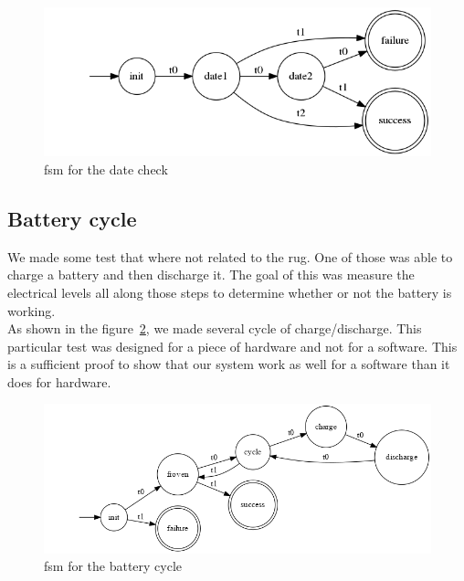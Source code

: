 \documentclass[12pt]{article}
\theoremstyle{definition}
\theoremstyle{definition}
\begin{document}
\begin{figure}
    \centering
    \includegraphics[scale=0.6]{graph/DateCheck}
    \caption{\gls{fsm} for the date check}
    \label{datecheck}
\end{figure}

\subsection{Battery cycle}

We made some test that where not related to the \gls{rug}. One of those was able to charge a battery and then discharge it. The goal of this was measure the electrical levels all along those steps to determine whether or not the battery is working.\\

As shown in the figure~\ref{battcycle2}, we made several cycle of charge/discharge. This particular test was designed for a piece of hardware and not for a software. This is a sufficient proof to show that our system work as well for a software than it does for hardware.

\begin{figure}
    \centering
    \includegraphics[scale=0.4]{graph/BatteryCycle.png}
    \caption{\gls{fsm} for the battery cycle}
    \label{battcycle2}
\end{figure}

\clearpage
{}

{}

\clearpage
\printglossaries


\end{document}
